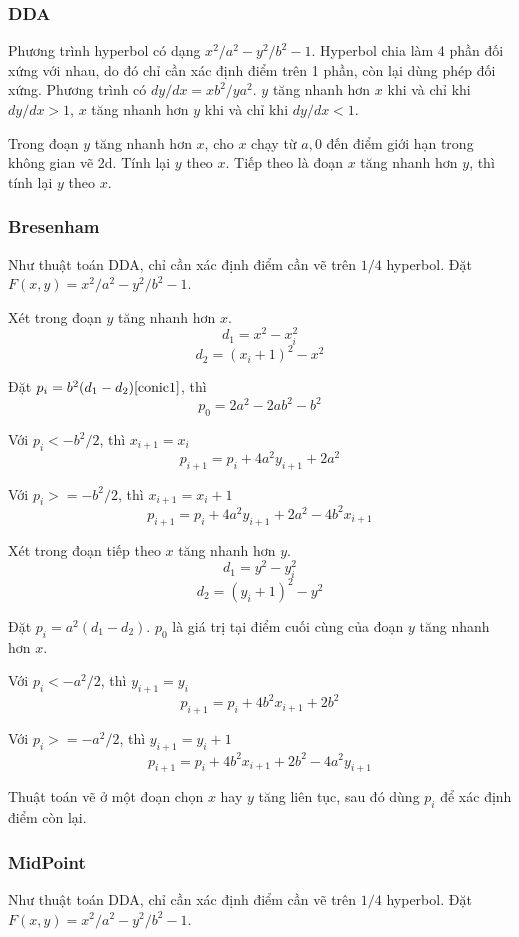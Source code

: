\documentclass[12pt]{article}
\begin{document}
\subsubsection{DDA}
Phương trình hyperbol có dạng \(x^2/a^2 - y^2/b^2 - 1\).
Hyperbol chia làm 4 phần đối xứng với nhau,
do đó chỉ cần xác định điểm trên 1 phần, còn lại dùng phép đối xứng.
Phương trình có \(dy/dx = xb^2/ya^2\).
\(y\) tăng nhanh hơn \(x\) khi và chỉ khi \(dy/dx > 1\),
\(x\) tăng nhanh hơn \(y\) khi và chỉ khi \(dy/dx < 1\).

Trong đoạn \(y\) tăng nhanh hơn \(x\), cho \(x\) chạy từ \(a, 0\)
đến điểm giới hạn trong không gian vẽ 2d. Tính lại \(y\) theo \(x\).
Tiếp theo là đoạn \(x\) tăng nhanh hơn \(y\), thì tính lại \(y\) theo \(x\).

\subsubsection{Bresenham}
Như thuật toán DDA, chỉ cần xác định điểm cần vẽ trên \(1/4\) hyperbol.
Đặt \(F(x, y) = x^2/a^2 - y^2/b^2 - 1\).

Xét trong đoạn \(y\) tăng nhanh hơn \(x\).
\[d_1 = x^2 - x_i^2\]
\[d_2 = (x_i + 1)^2 - x^2\]

Đặt \(p_i = b^2 (d_1 - d_2) \cite{conic1} \), thì
\[p_0 = 2a^2 - 2ab^2 - b^2\]

Với \(p_i < -b^2/2\), thì \(x_{i+1} = x_i\)
\[p_{i+1} = p_i + 4a^2 y_{i+1} + 2a^2\]

Với \(p_i >= -b^2/2\), thì \(x_{i+1} = x_i + 1\)
\[p_{i+1} = p_i + 4a^2 y_{i+1} + 2a^2 - 4b^2 x_{i+1}\]

Xét trong đoạn tiếp theo \(x\) tăng nhanh hơn \(y\).
\[d_1 = y^2 - y_i^2\]
\[d_2 = (y_i + 1)^2 - y^2\]

Đặt \(p_i = a^2 (d_1 - d_2)\).
\(p_0\) là giá trị tại điểm cuối cùng của đoạn \(y\) tăng nhanh hơn \(x\).

Với \(p_i < -a^2/2\), thì \(y_{i+1} = y_i\)
\[p_{i+1} = p_i + 4b^2 x_{i+1} + 2b^2\]

Với \(p_i >= -a^2/2\), thì \(y_{i+1} = y_i + 1\)
\[p_{i+1} = p_i + 4b^2 x_{i+1} + 2b^2 - 4a^2 y_{i+1}\]

Thuật toán vẽ ở một đoạn chọn \(x\) hay \(y\) tăng liên tục,
sau đó dùng \(p_i\) để xác định điểm còn lại.

\subsubsection{MidPoint}
Như thuật toán DDA, chỉ cần xác định điểm cần vẽ trên \(1/4\) hyperbol.
Đặt \(F(x, y) = x^2/a^2 - y^2/b^2 - 1\).
\end{document}
